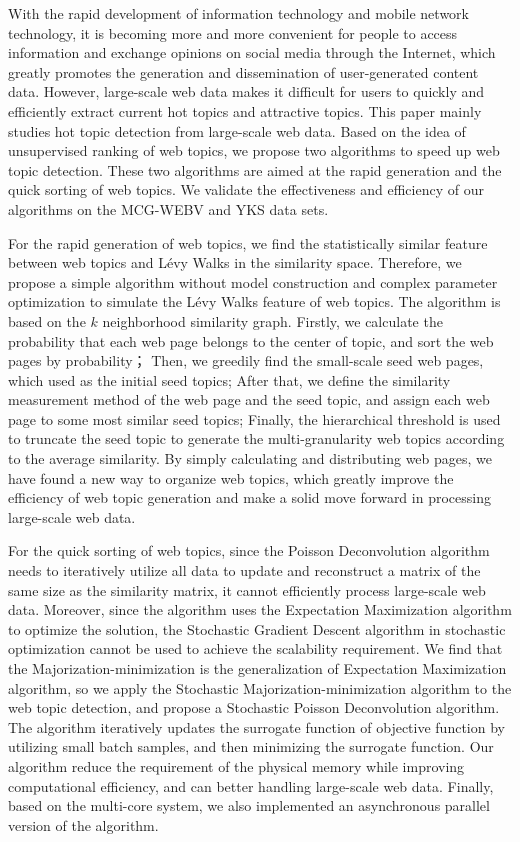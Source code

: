 With the rapid development of information technology and mobile network technology, it is becoming more and more convenient for people to access information and exchange opinions on social media through the Internet, which greatly promotes the generation and dissemination of user-generated content data. However, large-scale web data makes it difficult for users to quickly and efficiently extract current hot topics and attractive topics. This paper mainly studies hot topic detection from large-scale web data. Based on the idea of unsupervised ranking of web topics, we propose two algorithms to speed up web topic detection. These two algorithms are aimed at the rapid generation and the quick sorting of web topics. We validate the effectiveness and efficiency of our algorithms on the MCG-WEBV and YKS data sets.

For the rapid generation of web topics, we find the statistically similar feature between web topics and L\'evy Walks in the similarity space. Therefore, we propose a simple algorithm without model construction and complex parameter optimization to simulate the L\'evy Walks feature of web topics. The algorithm is based on the $k$ neighborhood similarity graph. Firstly, we calculate the probability that each web page belongs to the center of topic, and sort the web pages by probability； Then, we greedily find the small-scale seed web pages, which used as the initial seed topics; After that, we define the similarity measurement method of the web page and the seed topic, and assign each web page to some most similar seed topics; Finally, the hierarchical threshold is used to truncate the seed topic to generate the multi-granularity web topics according to the average similarity. By simply calculating and distributing web pages, we have found a new way to organize web topics, which greatly improve the efficiency of web topic generation and make a solid move forward in processing large-scale web data.

For the quick sorting of web topics, since the Poisson Deconvolution algorithm needs to iteratively utilize all data to update and reconstruct a matrix of the same size as the similarity matrix, it cannot efficiently process large-scale web data. Moreover, since the algorithm uses the Expectation Maximization algorithm to optimize the solution, the Stochastic Gradient Descent algorithm in stochastic optimization cannot be used to achieve the scalability requirement. We find that the Majorization-minimization is the generalization of Expectation Maximization algorithm, so we apply the Stochastic Majorization-minimization algorithm to the web topic detection, and propose a Stochastic Poisson Deconvolution algorithm. The algorithm iteratively updates the surrogate function of objective function by utilizing small batch samples, and then minimizing the surrogate function. Our algorithm reduce the requirement of the physical memory while improving computational efficiency, and can better handling large-scale web data. Finally, based on the multi-core system, we also implemented an asynchronous parallel version of the algorithm.

